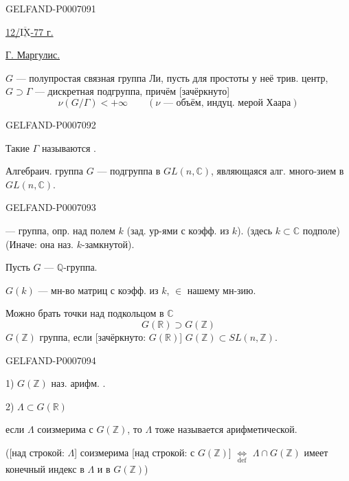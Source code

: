 \begin{GelfandAdjacentEvidence}{GELFAND-P000709}{1}

\underline{12/\(\overline{\underline{\mathrm{IX}}}\)-77 г.}\quad
{}

\underline{Г. Маргулис.}

\(G\) --- полупростая связная группа Ли, пусть для простоты у неё трив. центр,
\(G\supset\Gamma\) --- дискретная подгруппа, причём [зачёркнуто]
\[
\nu(G/\Gamma)<+\infty
\qquad(\nu\text{ --- объём, индуц. мерой Хаара})
\]
\end{GelfandAdjacentEvidence}
\begin{GelfandAdjacentEvidence}{GELFAND-P000709}{2}

Такие \(\Gamma\) называются .

Алгебраич. группа \(G\) --- подгруппа в \(GL(n,\mathbb C)\), являющаяся алг. много-зием в \(GL(n,\mathbb C)\).
\end{GelfandAdjacentEvidence}
\begin{GelfandAdjacentEvidence}{GELFAND-P000709}{3}


 --- группа, опр. над полем \(k\)
(зад. ур-ями с коэфф. из \(k\)). (здесь \(k\subset\mathbb C\) подполе)
(Иначе: она наз. \(k\)-замкнутой).

Пусть \(G\) --- \(\mathbb Q\)-группа.

\(G(k)\) --- мн-во матриц с коэфф. из \(k\), \(\in\) нашему мн-зию.

Можно брать точки над подкольцом в \(\mathbb C\)
\[
G(\mathbb R)\supset G(\mathbb Z)
\]
\(G(\mathbb Z)\) группа, если [зачёркнуто: \(G(\mathbb R)\)]
\(G(\mathbb Z)\subset SL(n,\mathbb Z)\).
\end{GelfandAdjacentEvidence}
\begin{GelfandAdjacentEvidence}{GELFAND-P000709}{4}


1) \(G(\mathbb Z)\) наз. арифм. .

2) \(\Lambda\subset G(\mathbb R)\)

если \(\Lambda\) соизмерима с \(G(\mathbb Z)\), то
\(\Lambda\) тоже называется арифметической.

([над строкой: \(\Lambda\)] соизмерима [над строкой: с \(G(\mathbb Z)\)]
\(\underset{\mathrm{def}}{\Longleftrightarrow}\)
\(\Lambda\cap G(\mathbb Z)\) имеет конечный индекс в \(\Lambda\) и в \(G(\mathbb Z)\))
\end{GelfandAdjacentEvidence}
